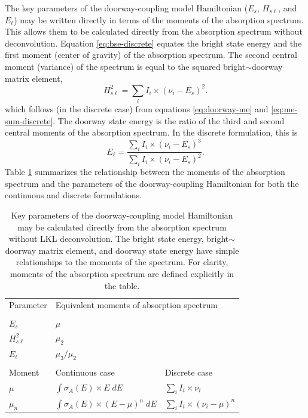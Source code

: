 The key parameters of the doorway-coupling model Hamiltonian ($E_s$,
$H_{s\ell}$, and $E_{\ell}$) may be written directly in terms of the
moments of the absorption spectrum.  This allows them to be calculated
directly from the absorption spectrum without deconvolution.  Equation
\ref{eq:bse-discrete} equates the bright state energy and the first
moment (center of gravity) of the absorption spectrum.  The second
central moment (variance) of the spectrum is equal to the squared
bright$\sim$doorway matrix element,
\begin{equation}
  \label{eq:doorway-moment}
  H_{s\ell}^2 = \sum_i I_i \times (\nu_i - E_s)^2.
\end{equation}
which follows (in the discrete case) from equations
\ref{eq:doorway-me} and \ref{eq:me-sum-discrete}.  The doorway state
energy is the ratio of the third and second central moments of the
absorption spectrum.  In the discrete formulation, this is
\begin{equation}
  E_{\ell} = \frac{{\displaystyle \sum_i I_i \times (\nu_i - E_s)^3}}
                {{\displaystyle \sum_i I_i \times (\nu_i - E_s)^2}}.
\end{equation}
Table \ref{table:moments} summarizes the relationship between the
moments of the absorption spectrum and the parameters of the
doorway-coupling Hamiltonian for both the continuous and discrete
formulations.

\begin{table}
  \caption{Key parameters of the doorway-coupling model Hamiltonian 
    may be calculated directly from the absorption spectrum without 
    LKL deconvolution.  The bright state energy, bright$\sim$doorway
    matrix element, and doorway state energy have simple relationships
    to the moments of the spectrum.  For clarity, moments of the
    absorption spectrum are defined explicitly in the table.}
  \label{table:moments}
  \centering
  \begin{tabular}{lll}
    & \\
    \toprule
    Parameter & \multicolumn{2}{l}{Equivalent moments of absorption spectrum} \\
    \midrule
    & \\
    $E_s$ & $\mu$ \\
    $H_{s\ell}^2$ & $\mu_2$ \\
    $E_{\ell}$ & $\mu_3 / \mu_2$ \\
    & \\
    \toprule
    Moment & Continuous case & Discrete case \\
    \midrule
    $\mu$ 
      & ${\displaystyle \int \sigma_A(E) \times E \; dE}$ 
      & ${\displaystyle \sum_i I_i \times \nu_i}$ \\
    $\mu_n$ 
      & ${\displaystyle \int \sigma_A(E) \times (E - \mu)^n \; dE}$
      & ${\displaystyle \sum_i I_i \times (\nu_i - \mu)^n}$ \\
      \bottomrule
  \end{tabular}
\end{table}

